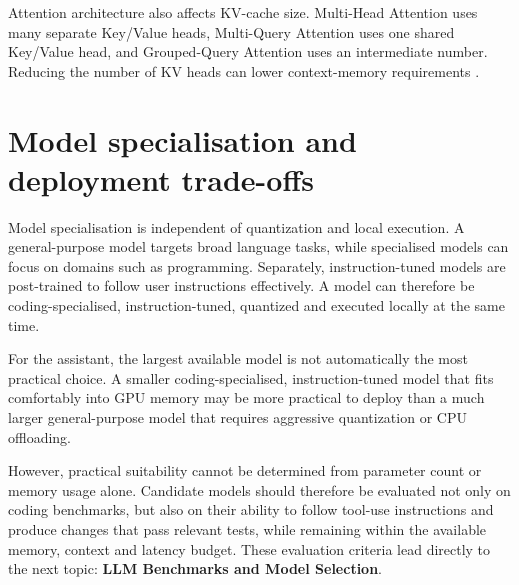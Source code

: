 Attention architecture also affects KV-cache size. Multi-Head Attention uses many separate Key/Value heads, Multi-Query Attention uses one shared Key/Value head, and Grouped-Query Attention uses an intermediate number. Reducing the number of KV heads can lower context-memory requirements \parencite{ainslie2023gqa}.

\section{Model specialisation and deployment trade-offs}

Model specialisation is independent of quantization and local execution. A general-purpose model targets broad language tasks, while specialised models can focus on domains such as programming. Separately, instruction-tuned models are post-trained to follow user instructions effectively. A model can therefore be coding-specialised, instruction-tuned, quantized and executed locally at the same time.

For the assistant, the largest available model is not automatically the most practical choice. A smaller coding-specialised, instruction-tuned model that fits comfortably into GPU memory may be more practical to deploy than a much larger general-purpose model that requires aggressive quantization or CPU offloading.

However, practical suitability cannot be determined from parameter count or memory usage alone. Candidate models should therefore be evaluated not only on coding benchmarks, but also on their ability to follow tool-use instructions and produce changes that pass relevant tests, while remaining within the available memory, context and latency budget. These evaluation criteria lead directly to the next topic: \textbf{LLM Benchmarks and Model Selection}.

\par\clearpage
\endgroup
